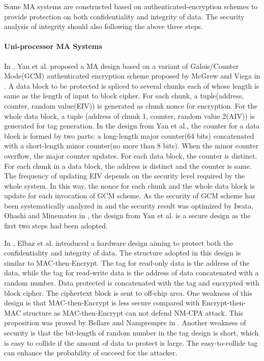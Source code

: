 \documentclass{article}
\begin{document}
Some MA systems are constructed based on authenticated-encryption schemes to
provide protection on both confidentiality and integrity of data. The security analysis of integrity should also following the above three steps. 

\paragraph{Uni-processor MA Systems}
In \cite{yan-MA}, Yan et al. proposed a MA design based on a variant of Galois/Counter Mode(GCM) authenticated encryption scheme proposed by McGrew and Viega in \cite{gcm}. A data block to be protected is spliced to several chunks each of whose length is same as the length of input to block cipher. For each chunk, a tuple(address, counter, random value(EIV)) is generated as chunk nonce for encryption. For the whole data block, a tuple (address of chunk 1, counter, random value 2(AIV)) is generated for tag generation. 
In the design from Yan et al., the counter for a data block is formed by two parts: a long-length major counter(64 bits) concatenated with a short-length minor counter(no more than 8 bits). When the minor counter overflow, the major counter updates. For each data block, the counter is distinct. For each chunk in a data block, the address is distinct and the counter is same. The frequency of updating EIV depends on the security level required by the whole system.  In this way, the nonce for each chunk and the whole data block is update for each invocation of GCM scheme. As the security of GCM scheme has been systematically analyzed in \cite{gcm} and the security result was optimized by Iwata, Ohashi and Minematsu in \cite{breaking}, the design from Yan et al. is a secure design as the first two steps had been adopted.


In \cite{pc-ice}, Elbaz et al. introduced a hardware design aiming to protect both the confidentiality and integrity of data. The structure adopted in this design is similar to MAC-then-Encrypt. The tag for read-only data is the address of the data, while the tag for read-write data is the address of data concatenated with a random number. Data protected is concatenated with the tag and encrypted with block cipher. The ciphertext block is sent to off-chip area.
One weakness of this design is that MAC-then-Encrypt is less secure compared with Encrypt-then-MAC structure as MAC-then-Encrypt can not defend NM-CPA attack. This proposition was proved by Bellare and Namprempre in \cite{ae-notion}.
Another weakness of security is that the bit-length of random number in the tag design is short, which is easy to collide if the amount of data to protect is large. The easy-to-collide tag can enhance the probability of succeed for the attacker.
\end{document}
